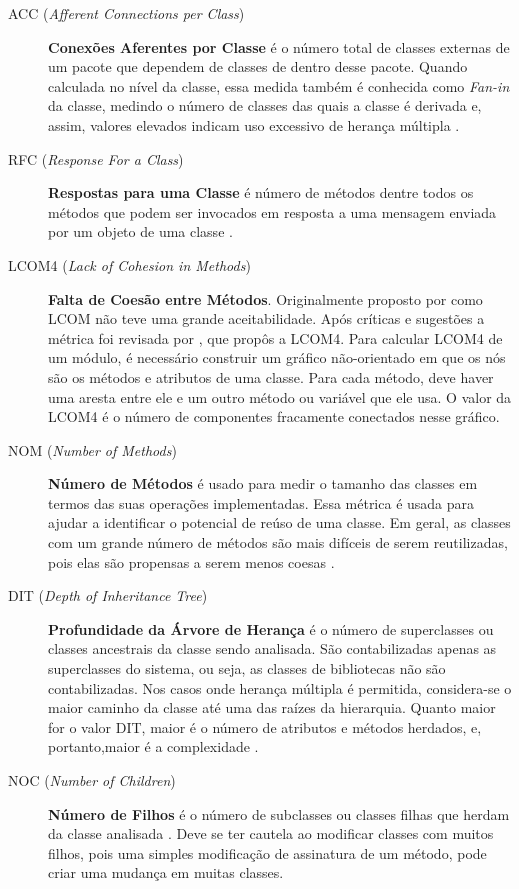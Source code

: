 \begin{description}

	\item[ACC (\textit{Afferent Connections per Class})] 
	\textbf{Conexões Aferentes por Classe} é o número total de classes externas de um pacote que dependem de classes de dentro desse pacote. Quando 
	calculada no nível da classe, essa medida também é conhecida como 
	\textit{Fan-in} da classe, medindo o número de classes das quais a classe é derivada e, assim, valores elevados indicam uso excessivo de herança 
	múltipla \cite{McCabe94} \cite{Chidamber94}.


	\item[RFC (\textit{Response For a Class})] \textbf{Respostas para uma 
	Classe} é número de métodos dentre todos os métodos que podem ser invocados 
	em resposta a uma mensagem enviada por um objeto de uma classe 
	\cite{Sharble93}.
	
	\item[LCOM4 (\textit{Lack of Cohesion in Methods})] \textbf{Falta de Coesão
	entre Métodos}. Originalmente proposto por  
	como LCOM não teve uma grande aceitabilidade. Após críticas e 
	sugestões a métrica foi revisada por , que propôs a LCOM4. 
	Para calcular LCOM4 de um módulo, é necessário construir um gráfico 
	não-orientado em que os nós são os métodos e atributos de uma classe. Para
	cada método, deve haver uma aresta entre ele e um outro método ou variável 
	que ele usa. O valor da LCOM4 é o número de componentes fracamente 
	conectados nesse gráfico. 

	
	\item[NOM (\textit{Number of Methods})] \textbf{Número de Métodos} é usado 
	para medir o tamanho das classes em termos das suas operações 
	implementadas. Essa métrica é usada para ajudar a identificar o 
	potencial de reúso de uma classe. Em geral, as classes com um grande 
	número de métodos são mais difíceis de serem reutilizadas, pois elas 
	são propensas a serem menos coesas \cite{Lorenz94}.
	

	\item [DIT (\textit{Depth of Inheritance Tree})] \textbf{Profundidade da 
	Árvore de Herança} é o número de superclasses ou classes ancestrais da 
	classe sendo analisada. São contabilizadas apenas as superclasses do 
	sistema, ou seja, as classes de bibliotecas não são contabilizadas. 
	Nos casos onde herança múltipla é permitida, considera-se o maior 
	caminho da classe até uma das raízes da hierarquia. Quanto maior for o 
	valor DIT, maior é o número de atributos e métodos herdados, e, portanto,maior é a complexidade \cite{Shih97}.
	
	\item[NOC (\textit{Number of Children})] \textbf{Número de Filhos} é o 
	número de subclasses ou classes filhas que herdam da classe analisada 
	\cite{Rosenberg97}. Deve se ter cautela ao modificar classes com muitos 
	filhos, pois uma simples modificação de assinatura de um método, pode criar
	uma mudança em muitas classes.
	

\end{description}
	
